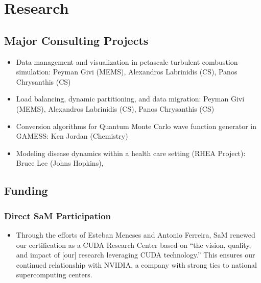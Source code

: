 \chapter{Research}

\section{Major Consulting Projects}
\begin{itemize}
   \item Data management and visualization in petascale turbulent
         combustion simulation: Peyman Givi (MEMS), Alexandros
         Labrinidis (CS), Panos Chrysanthis (CS)
   \item Load balancing, dynamic partitioning, and data migration: Peyman
         Givi (MEMS), Alexandros Labrinidis (CS), Panos Chrysanthis (CS)
   \item Conversion algorithms for Quantum Monte Carlo wave function generator in GAMESS: Ken Jordan (Chemistry)
   \item Modeling disease dynamics within a health care setting (RHEA Project): Bruce Lee (Johns Hopkins), 
\end{itemize}

\section{Funding}
\subsection{Direct SaM Participation}
\begin{itemize}
   \item Through the efforts of Esteban Meneses and Antonio Ferreira, SaM renewed our certification as a CUDA Research Center based on ``the vision,
quality, and impact of [our] research leveraging CUDA technology.''  This ensures our continued relationship with NVIDIA, a company with strong ties to national supercomputing centers.
\end{itemize}

